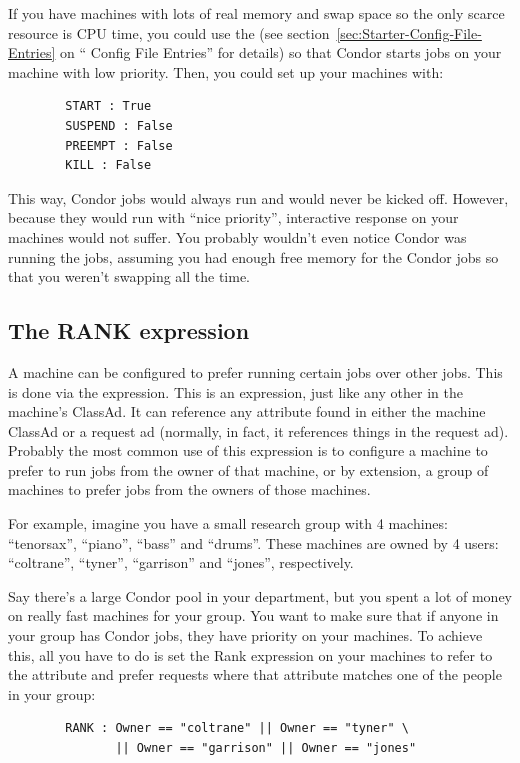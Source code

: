 \Note If you have machines with lots of real memory and swap space so
  the only scarce resource is CPU time, you could use the
   (see
  section~\ref{sec:Starter-Config-File-Entries} on ``
  Config File Entries'' for details) so that Condor starts jobs on
  your machine with low priority.  Then, you could set
  up your machines with:
\begin{verbatim}
        START : True
        SUSPEND : False
        PREEMPT : False
        KILL : False
\end{verbatim}
  This way, Condor jobs would always run and would never be kicked
  off. 
  However, because they would run with ``nice priority'', interactive 
  response on your machines would not suffer.
  You probably wouldn't even notice Condor was running the jobs, 
  assuming you had enough free memory for the Condor jobs so that you 
  weren't swapping all the time.

\subsection{\label{sec:Rank-Expression}
The RANK expression}

A machine can be configured to prefer running certain jobs over other
jobs.  This is done via the  expression.  This is an
expression, just like any other in the machine's ClassAd.  It can
reference any attribute found in either the machine ClassAd or a
request ad (normally, in fact, it references things in the request
ad).  Probably the most common use of this expression is to configure a
machine to prefer to run jobs from the owner of that machine, or by
extension, a group of machines to prefer jobs from the owners of those
machines.  

For example, imagine you have a small research group with 4 machines:
``tenorsax'', ``piano'', ``bass'' and ``drums''.  These machines are
owned by 4 users: ``coltrane'', ``tyner'', ``garrison'' and ``jones'',
respectively.  

Say there's a large Condor pool in your department, but you spent a
lot of money on really fast machines for your group.  You want to make
sure that if anyone in your group has Condor jobs, they have priority
on your machines.  To achieve this, all you have to do is set the Rank
expression on your machines to refer to the  attribute and
prefer requests where that attribute matches one of the people in your
group:
\begin{verbatim}
        RANK : Owner == "coltrane" || Owner == "tyner" \
               || Owner == "garrison" || Owner == "jones"
\end{verbatim}

